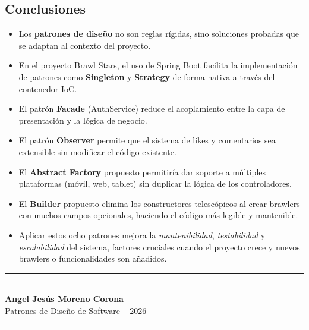 \documentclass[12pt,a4paper]{article}
\begin{document}
\subsection{Conclusiones}

\begin{tcolorbox}[colback=bsDark!8, colframe=bsOrange, arc=4pt, title={\textbf{Conclusiones finales}}, coltitle=white]
\begin{itemize}
  \item Los \textbf{patrones de dise\~no} no son reglas r\'igidas, sino soluciones probadas que se adaptan al contexto del proyecto.
  \item En el proyecto Brawl Stars, el uso de Spring Boot facilita la implementaci\'on de patrones como \textbf{Singleton} y \textbf{Strategy} de forma nativa a trav\'es del contenedor IoC.
  \item El patr\'on \textbf{Facade} (AuthService) reduce el acoplamiento entre la capa de presentaci\'on y la l\'ogica de negocio.
  \item El patr\'on \textbf{Observer} permite que el sistema de likes y comentarios sea extensible sin modificar el c\'odigo existente.
  \item El \textbf{Abstract Factory} propuesto permitir\'ia dar soporte a m\'ultiples plataformas (m\'ovil, web, tablet) sin duplicar la l\'ogica de los controladores.
  \item El \textbf{Builder} propuesto elimina los constructores telescópicos al crear brawlers con muchos campos opcionales, haciendo el c\'odigo m\'as legible y mantenible.
  \item Aplicar estos ocho patrones mejora la \textit{mantenibilidad}, \textit{testabilidad} y \textit{escalabilidad} del sistema, factores cruciales cuando el proyecto crece y nuevos brawlers o funcionalidades son a\~nadidos.
\end{itemize}
\end{tcolorbox}

\vspace{1cm}

\begin{center}
{\color{bsOrange}\rule{10cm}{2pt}}\\[0.3cm]
{\large\bfseries\color{bsDark} Angel Jes\'us Moreno Corona}\\[0.2cm]
{\color{gray} Patrones de Dise\~no de Software -- 2026}\\[0.3cm]
{\color{bsOrange}\rule{10cm}{2pt}}
\end{center}
\end{document}
